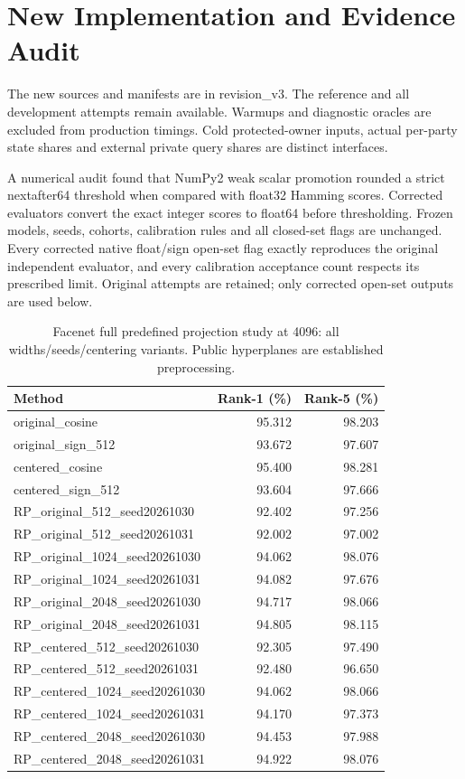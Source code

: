 \section{New Implementation and Evidence Audit}\label{suppsec:generated_v3_supplement:1}

The new sources and manifests are in revision\_v3. The reference and all development attempts remain available. Warmups and diagnostic oracles are excluded from production timings. Cold protected-owner inputs, actual per-party state shares and external private query shares are distinct interfaces.

A numerical audit found that NumPy2 weak scalar promotion rounded a strict nextafter64 threshold when compared with float32 Hamming scores. Corrected evaluators convert the exact integer scores to float64 before thresholding. Frozen models, seeds, cohorts, calibration rules and all closed-set flags are unchanged. Every corrected native float/sign open-set flag exactly reproduces the original independent evaluator, and every calibration acceptance count respects its prescribed limit. Original attempts are retained; only corrected open-set outputs are used below.

\begin{table}[t]
\caption{Facenet full predefined projection study at 4096: all widths/seeds/centering variants. Public hyperplanes are established preprocessing.}
\label{tab:v3allfacenet}\centering\small
\setlength{\tabcolsep}{3pt}
\begin{tabular}{lrr}
\toprule
Method & Rank-1 (\%) & Rank-5 (\%) \\
\midrule
original\_cosine & 95.312 & 98.203 \\
original\_sign\_512 & 93.672 & 97.607 \\
centered\_cosine & 95.400 & 98.281 \\
centered\_sign\_512 & 93.604 & 97.666 \\
RP\_original\_512\_seed20261030 & 92.402 & 97.256 \\
RP\_original\_512\_seed20261031 & 92.002 & 97.002 \\
RP\_original\_1024\_seed20261030 & 94.062 & 98.076 \\
RP\_original\_1024\_seed20261031 & 94.082 & 97.676 \\
RP\_original\_2048\_seed20261030 & 94.717 & 98.066 \\
RP\_original\_2048\_seed20261031 & 94.805 & 98.115 \\
RP\_centered\_512\_seed20261030 & 92.305 & 97.490 \\
RP\_centered\_512\_seed20261031 & 92.480 & 96.650 \\
RP\_centered\_1024\_seed20261030 & 94.062 & 98.066 \\
RP\_centered\_1024\_seed20261031 & 94.170 & 97.373 \\
RP\_centered\_2048\_seed20261030 & 94.453 & 97.988 \\
RP\_centered\_2048\_seed20261031 & 94.922 & 98.076 \\
\bottomrule
\end{tabular}
\end{table}


